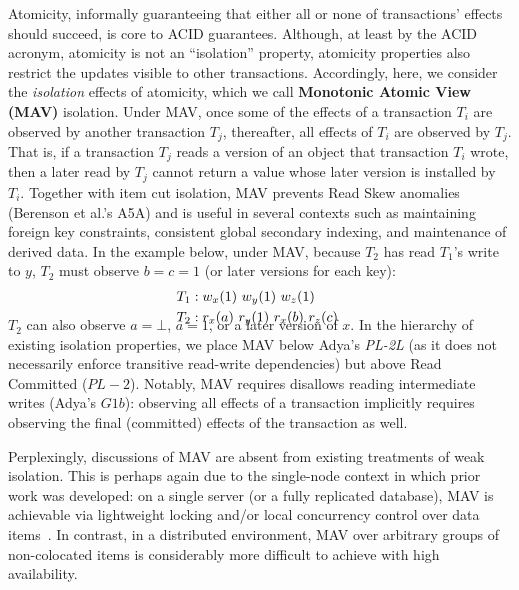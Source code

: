 Atomicity, informally guaranteeing that either all or none of
transactions' effects should succeed, is core to ACID
guarantees. Although, at least by the ACID acronym, atomicity is not
an ``isolation'' property, atomicity properties also restrict the
updates visible to other transactions. Accordingly, here, we consider
the \textit{isolation} effects of atomicity, which we call
\textbf{Monotonic Atomic View (MAV)} isolation.  Under MAV, once some of the
effects of a transaction $T_i$ are observed by another transaction
$T_j$, thereafter, all effects of $T_i$ are observed by $T_j$. That
is, if a transaction $T_j$ reads a version of an object that
transaction $T_i$ wrote, then a later read by $T_j$ cannot return a
value whose later version is installed by $T_i$. Together with item
cut isolation, MAV prevents Read Skew anomalies (Berenson et al.'s A5A)
and is useful in several contexts such as maintaining foreign key
constraints, consistent global secondary indexing, and maintenance of
derived data. In the example below, under MAV, because $T_2$ has read
$T_1$'s write to $y$, $T_2$ must observe $b=c=1$ (or later versions
for each key):
\begin{align*}
\small
T_1 &: w_x(1)~w_y(1)~w_z(1)
\\T_2 &: r_x(a)~r_y(1)~r_x(b)~r_z(c)~\\[-1.5em]
\end{align*}
$T_2$ can also observe $a=\bot$, $a=1$, or a later version of $x$. In
the hierarchy of existing isolation properties, we place MAV below
Adya's \textit{PL-2L} (as it does not necessarily enforce transitive
read-write dependencies) but above Read Committed ($PL-2$). Notably,
MAV requires disallows reading intermediate writes (Adya's $G1b$):
observing all effects of a transaction implicitly requires observing
the final (committed) effects of the transaction as well.

Perplexingly, discussions of MAV are absent from existing treatments of
weak isolation. This is perhaps again due to the single-node context
in which prior work was developed: on a single server (or a fully
replicated database), MAV is achievable via lightweight locking and/or
local concurrency control over data items~\cite{gstore,
  kemme-thesis}. In contrast, in a distributed environment, MAV over
arbitrary groups of non-colocated items is considerably more difficult
to achieve with high availability.


